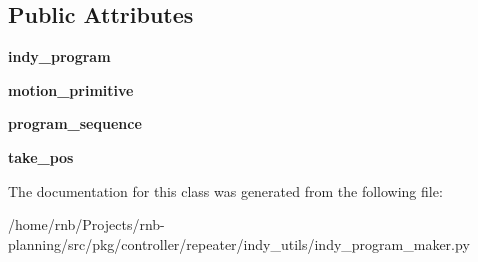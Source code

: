 \subsection*{Public Attributes}
\begin{DoxyCompactItemize}
\item 
\mbox{\label{classrnb-planning_1_1src_1_1pkg_1_1controller_1_1repeater_1_1indy__utils_1_1indy__program__maker_1_1_pick_n_place_a0978f857b530f1a4ecfe1e49c52b6dc0}} 
{\bfseries indy\+\_\+program}
\item 
\mbox{\label{classrnb-planning_1_1src_1_1pkg_1_1controller_1_1repeater_1_1indy__utils_1_1indy__program__maker_1_1_pick_n_place_a86d6f15e8c5fd9c23c7b215c50f90846}} 
{\bfseries motion\+\_\+primitive}
\item 
\mbox{\label{classrnb-planning_1_1src_1_1pkg_1_1controller_1_1repeater_1_1indy__utils_1_1indy__program__maker_1_1_pick_n_place_a35ad562d9ee59103c3dfce890fa3afc1}} 
{\bfseries program\+\_\+sequence}
\item 
\mbox{\label{classrnb-planning_1_1src_1_1pkg_1_1controller_1_1repeater_1_1indy__utils_1_1indy__program__maker_1_1_pick_n_place_a5bd89a70b7eaa8ab5a36323d6040fcc6}} 
{\bfseries take\+\_\+pos}
\end{DoxyCompactItemize}


The documentation for this class was generated from the following file\+:\begin{DoxyCompactItemize}
\item 
/home/rnb/\+Projects/rnb-\/planning/src/pkg/controller/repeater/indy\+\_\+utils/indy\+\_\+program\+\_\+maker.\+py\end{DoxyCompactItemize}
